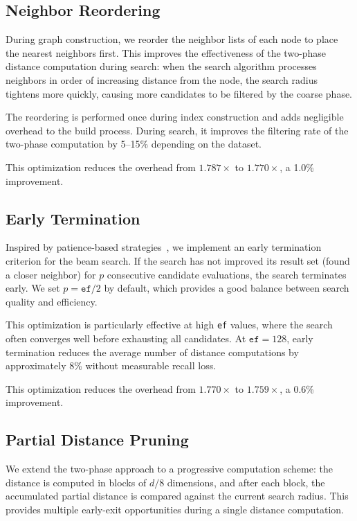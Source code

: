 \documentclass[10pt,journal]{IEEEtran}
\begin{document}
\subsection{Neighbor Reordering}

During graph construction, we reorder the neighbor lists of each node to place the nearest neighbors first. This improves the effectiveness of the two-phase distance computation during search: when the search algorithm processes neighbors in order of increasing distance from the node, the search radius tightens more quickly, causing more candidates to be filtered by the coarse phase.

The reordering is performed once during index construction and adds negligible overhead to the build process. During search, it improves the filtering rate of the two-phase computation by 5--15\% depending on the dataset.

This optimization reduces the overhead from $1.787\times$ to $1.770\times$, a 1.0\% improvement.

\subsection{Early Termination}

Inspired by patience-based strategies~\cite{teofili2025patience}, we implement an early termination criterion for the beam search. If the search has not improved its result set (found a closer neighbor) for $p$ consecutive candidate evaluations, the search terminates early. We set $p = \texttt{ef} / 2$ by default, which provides a good balance between search quality and efficiency.

This optimization is particularly effective at high \texttt{ef} values, where the search often converges well before exhausting all candidates. At $\texttt{ef} = 128$, early termination reduces the average number of distance computations by approximately 8\% without measurable recall loss.

This optimization reduces the overhead from $1.770\times$ to $1.759\times$, a 0.6\% improvement.

\subsection{Partial Distance Pruning}

We extend the two-phase approach to a progressive computation scheme: the distance is computed in blocks of $d/8$ dimensions, and after each block, the accumulated partial distance is compared against the current search radius. This provides multiple early-exit opportunities during a single distance computation.
\end{document}
